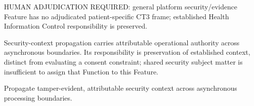 HUMAN ADJUDICATION REQUIRED: general platform security/\allowbreak{}evidence Feature has no adjudicated patient-specific CT3 frame; established Health Information Control responsibility is preserved.



Security-context propagation carries attributable operational authority across asynchronous boundaries. Its responsibility is preservation of established context, distinct from evaluating a consent constraint; shared security subject matter is insufficient to assign that Function to this Feature.



Propagate tamper-evident, attributable security context across asynchronous processing boundaries.



